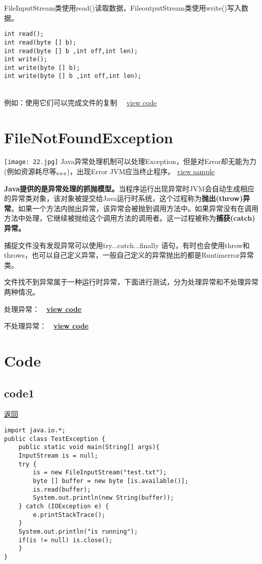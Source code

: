 \documentclass[a4paper,10pt]{article}
\begin{document}
\begin{CJK}{UTF8}{gbsn}
FileInputStream类使用read()读取数据，FileoutputStream类使用write()写入数据。\newpage
\begin{lstlisting}
int read();
int read(byte [] b);
int read(byte [] b ,int off,int len);
int write();
int write(byte [] b);
int write(byte [] b ,int off,int len);

\end{lstlisting}
\hypertarget{Test}{}
\ \\
例如：使用它们可以完成文件的复制 \ \ \hyperlink{copy}{view code}\hypertarget{rcopy}{}
\newpage
\section{FileNotFoundException}
\texttt{[image: 22.jpg]}
\hypertarget{rerror}{} Java异常处理机制可以处理Exception，但是对Error却无能为力(例如资源耗尽等。。。)，出现Error JVM应当终止程序。 \hyperlink{error}{view sample}

\textbf{Java提供的是异常处理的抓抛模型。}当程序运行出现异常时JVM会自动生成相应的异常类对象，该对象被提交给Java运行时系统，这个过程称为\textbf{抛出(throw)异常}。如果一个方法内抛出异常，该异常会被抛到调用方法中。如果异常没有在调用方法中处理，它继续被抛给这个调用方法的调用者。这一过程被称为\textbf{捕获(catch)异常。}\par
捕捉文件没有发现异常可以使用try...catch...finally 语句，有时也会使用throw和throws，也可以自己定义异常，一般自己定义的异常抛出的都是Runtimerror异常类。


文件找不到异常属于一种运行时异常，下面进行测试，分为处理异常和不处理异常两种情况。\hypertarget{ex}{}\par


处理异常：\ \ \hyperlink{code1}{\textbf{view code}} \par

不处理异常：\ \ \hyperlink{code2}{\textbf{view code}}\par

\section{Code}
\subsection{code1}\hypertarget{code1}{}\hyperlink{ex}{返回}
\begin{lstlisting}
import java.io.*;
public class TestException {
    public static void main(String[] args){
	InputStream is = null;
	try {
	    is = new FileInputStream("test.txt");
	    byte [] buffer = new byte [is.available()];
	    is.read(buffer);
	    System.out.println(new String(buffer));
	} catch (IOException e) {
   	    e.printStackTrace();
	}
	System.out.println("is running");
	if(is != null) is.close();
    }
}
\end{lstlisting}\newpage

\end{CJK}
\end{document}
